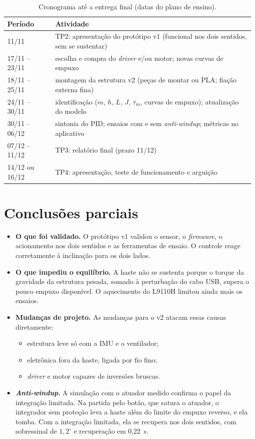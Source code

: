 \documentclass[a4paper,11pt]{article}
\begin{document}
\begin{table}[H]
\centering\small
\caption{Cronograma até a entrega final (datas do plano de ensino).}
\label{tab:cronograma}
\begin{tabular}{@{}ll@{}}
\toprule
\textbf{Período} & \textbf{Atividade} \\
\midrule
11/11 & TP2: apresentação do protótipo v1 (funcional nos dois sentidos, sem se sustentar) \\
17/11 -- 23/11 & escolha e compra do \textit{driver} e/ou motor; novas curvas de empuxo \\
18/11 -- 25/11 & montagem da estrutura v2 (peças de montar ou PLA; fiação externa fina) \\
24/11 -- 30/11 & identificação ($m$, $h$, $L$, $J$, $\tau_m$, curvas de empuxo); atualização do modelo \\
30/11 -- 06/12 & sintonia do PID; ensaios com e sem \textit{anti-windup}; métricas no aplicativo \\
07/12 -- 11/12 & TP3: relatório final (prazo 11/12) \\
14/12 ou 16/12 & TP4: apresentação, teste de funcionamento e arguição \\
\bottomrule
\end{tabular}
\end{table}

\section{Conclusões parciais}

\begin{itemize}
  \item \textbf{O que foi validado.} O protótipo v1 validou o sensor, o \textit{firmware}, o
    acionamento nos dois sentidos e as ferramentas de ensaio. O controle reage corretamente à
    inclinação para os dois lados.
  \item \textbf{O que impediu o equilíbrio.} A haste não se sustenta porque o torque da gravidade da
    estrutura pesada, somado à perturbação do cabo USB, supera o pouco empuxo disponível. O
    aquecimento do L9110H limitou ainda mais os ensaios.
  \item \textbf{Mudanças de projeto.} As mudanças para o v2 atacam essas causas diretamente:
    \begin{itemize}
      \item estrutura leve só com a IMU e o ventilador;
      \item eletrônica fora da haste, ligada por fio fino;
      \item \textit{driver} e motor capazes de inversões bruscas.
    \end{itemize}
  \item \textbf{\textit{Anti-windup}.} A simulação com o atuador medido confirma o papel da integração
    limitada. Na partida pelo botão, que satura o atuador, o integrador sem proteção leva a haste além
    do limite do empuxo reverso, e ela tomba. Com a integração limitada, ela se recupera nos dois
    sentidos, com sobressinal de $1{,}2^\circ$ e recuperação em 0,22~s.
\end{itemize}
\end{document}
